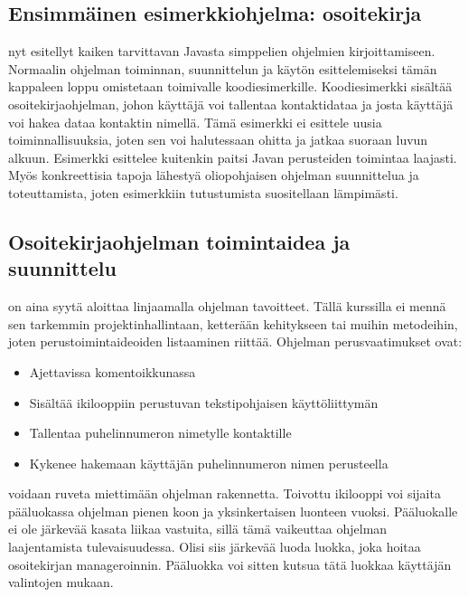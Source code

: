 \documentclass[a4paper,justified,notoc]{tufte-book}
\begin{document}
\begin{fullwidth}

\section{Ensimmäinen esimerkkiohjelma: osoitekirja}
\label{osoitekirja}

 nyt esitellyt kaiken tarvittavan Javasta simppelien ohjelmien
kirjoittamiseen. Normaalin ohjelman toiminnan, suunnittelun ja käytön esittelemiseksi tämän
kappaleen loppu omistetaan toimivalle koodiesimerkille. Koodiesimerkki sisältää
osoitekirjaohjelman, johon käyttäjä voi tallentaa kontaktidataa ja josta käyttäjä voi hakea dataa
kontaktin nimellä. Tämä esimerkki ei esittele uusia toiminnallisuuksia, joten sen voi halutessaan
ohitta ja jatkaa suoraan luvun  alkuun. Esimerkki esittelee kuitenkin paitsi
Javan perusteiden toimintaa laajasti. Myös konkreettisia tapoja lähestyä oliopohjaisen ohjelman
suunnittelua ja toteuttamista, joten esimerkkiin tutustumista suositellaan lämpimästi.

\subsection{Osoitekirjaohjelman toimintaidea ja suunnittelu}
\label{osoitekirja suunnittelu}

 on aina syytä aloittaa linjaamalla ohjelman tavoitteet. Tällä
kurssilla ei mennä sen tarkemmin projektinhallintaan, ketterään kehitykseen tai muihin metodeihin,
joten perustoimintaideoiden listaaminen riittää. Ohjelman perusvaatimukset ovat:

\begin{itemize}
	\item Ajettavissa komentoikkunassa
	\item Sisältää ikilooppiin perustuvan tekstipohjaisen käyttöliittymän
	\item Tallentaa puhelinnumeron nimetylle kontaktille
	\item Kykenee hakemaan käyttäjän puhelinnumeron nimen perusteella
\end{itemize}

 voidaan ruveta miettimään ohjelman rakennetta. Toivottu ikilooppi
voi sijaita pääluokassa ohjelman pienen koon ja yksinkertaisen luonteen vuoksi. Pääluokalle ei ole
järkevää kasata liikaa vastuita, sillä tämä vaikeuttaa ohjelman laajentamista tulevaisuudessa.
Olisi siis järkevää luoda luokka, joka hoitaa osoitekirjan manageroinnin. Pääluokka voi sitten
kutsua tätä luokkaa käyttäjän valintojen mukaan.


\end{fullwidth}
\end{document}
